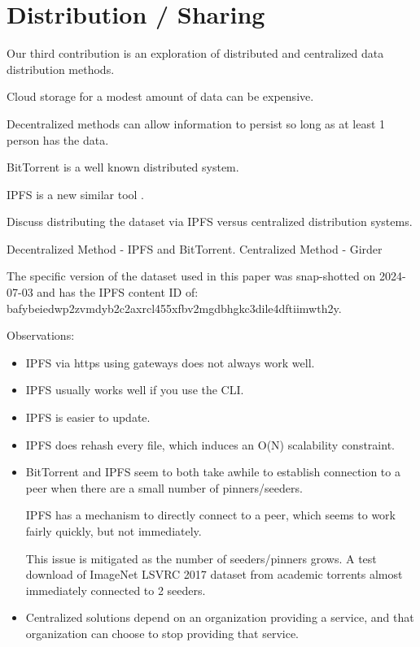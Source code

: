 \documentclass[10pt,twocolumn,letterpaper]{article}
\begin{document}
\section{Distribution / Sharing}


Our third contribution is an exploration of distributed and centralized data distribution methods. 

Cloud storage for a modest amount of data can be expensive.

Decentralized methods can allow information to persist so long as at least 1
person has the data.

BitTorrent is a well known distributed system.

IPFS is a new similar tool \cite{benet_ipfs_2014,bieri_overview_2021}.


Discuss distributing the dataset via IPFS versus centralized distribution
systems.

Decentralized Method - IPFS and BitTorrent.
Centralized Method - Girder


The specific version of the dataset used in this paper was snap-shotted on
2024-07-03 and has the IPFS content ID of:
bafybeiedwp2zvmdyb2c2axrcl455xfbv2mgdbhgkc3dile4dftiimwth2y.

Observations:
\begin{itemize}
    \item IPFS via https using gateways does not always work well.
    \item IPFS usually works well if you use the CLI.
    \item IPFS is easier to update.
    \item IPFS does rehash every file, which induces an O(N) scalability constraint.

    \item BitTorrent and IPFS seem to both take awhile to establish connection
          to a peer when there are a small number of pinners/seeders.

          IPFS has a mechanism to directly connect to a peer, which seems to
          work fairly quickly, but not immediately.

          This issue is mitigated as the number of seeders/pinners grows.
          A test download of ImageNet LSVRC 2017 dataset from academic torrents
          almost immediately connected to 2 seeders.

    \item Centralized solutions depend on an organization providing a service,
          and that organization can choose to stop providing that service.
\end{itemize}
\end{document}
